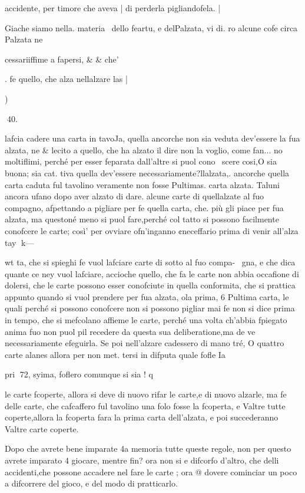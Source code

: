 \documentclass[12pt,a6paper]{article}
\begin{document}
 

 

 

accidente, per timore che aveva |
di perderla pigliandofela. |

Giache siamo nella. materia \
dello feartu, e delPalzata, vi di.
ro alcune cofe circa Palzata ne

 

cessariiffime a fapersi, & & che’

. fe quello, che alza nellalzare
las |

)

 
40.

lafcia cadere una carta in tavoJa, quella ancorche non sia veduta dev’essere la fua alzata, ne
& lecito a quello, che ha alzato
il dire non la voglio, come fan...
no moltiflimi, perché per esser
feparata dall’altre si puol cono~
scere cosi,O sia buona; sia cat.
tiva quella dev’essere necessariamente?llalzata,. ancorche
quella carta caduta ful tavolino
veramente non fosse Pultimas.
carta alzata. Taluni ancora
ufano dopo aver alzato di dare.
alcune carte di quellalzate al
fuo compagno, afpettando a pigliare per fe quella carta, che.
più gli piace per fua alzata, ma
questoné meno si puol fare,perché col tatto si possono facilmente conofcere le carte; così’
per ovviare ofn’inganno ¢neceffario prima di venir all’alza
tay
k—

wt
ta, che si spieghi fe vuol lafciare carte di sotto al fuo compa-~
gna, e che dica quante ce ney
vuol lafciare, accioche quello,
che fa le carte non abbia occafione di dolersi, che le carte
possono esser conofciute in quella conformita, che si prattica
appunto quando si vuol prendere per fua alzata, ola prima, 6
Pultima carta, le quali perché si
possono conofcere non si possono pigliar mai fe non si dice prima in tempo, che si mefcolano
affieme le carte, perché una
volta ch’abbia fpiegato anima
fuo non puol pil recedere da
questa sua deliberatione,ma de
ve necessariamente efeguirla.
Se poi nell’alzare cadessero
di mano tré, O quattro carte
alanes allora per non met.
tersi in difputa quale fofle Ia

pri
72,
syima, foflero comunque si sia
! q

le carte fcoperte, allora si deve
di nuovo rifar le carte,e di nuovo alzarle, ma fe delle carte,
che cafcaffero ful tavolino una
folo fosse la fcoperta, e Valtre
tutte coperte,allora la fcoperta
fara la prima carta dell’alzata,
e poi succederanno Valtre carte
coperte.

Dopo che avrete bene imparate 4a memoria tutte queste regole, non per questo avrete
imparato 4 giocare, mentre fin?
ora non si e difcorfo d’altro,
che delli accidenti,che possone
accadere nel fare le carte ; ora
@ dovere cominciar un poco a
difcorrere del gioco, e del modo di pratticarlo.
\end{document}

